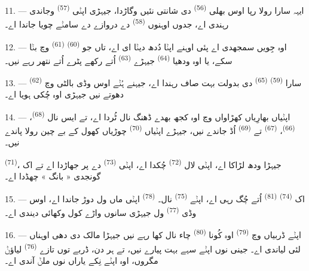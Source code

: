 11. --- ایہہ سارا رولا رپا اوس بھلی  \textsuperscript{(56)} دی
شانتی نئیں وگاڑدا، جیہڑی اپݨی  \textsuperscript{(57)} وجاندی رہندی اے،
جدوں اوہنوں  \textsuperscript{(58)} دے دروازے دے سامݨے چویا جاندا اے۔

12. --- اوہ جِویں سمجھدی اے پئی اوہنے اپݨا دُدھ دیݨا ای اے، تاں جو
 \textsuperscript{(60)}  \textsuperscript{(61)}
وچ  بݨا سکے، یا اوہ ودھیا  \textsuperscript{(64)} جیہڑے
 \textsuperscript{(63)} اُتے رکھے پٹرے اُتے نتھر رہے نیں۔

13. --- سارا  \textsuperscript{(59)} 
\textsuperscript{(65)} دی بدولت بہت صاف رہندا اے، جیہنے ہُݨے اوس وڈی بالٹی وچ
 \textsuperscript{(62)} دھوتے نیں جیہڑی اوہ چُکی ہویا اے۔

\VUsaut{3.0mm}
\VUsaut{3.0mm}

14. --- اپݨیاں بھارِیاں کھڑاواں وچ اوہ کجھ بھدے ڈھنگ نال ٹُردا اے، تے ایس نال
 \textsuperscript{(68)}،  \textsuperscript{(66)}،
 \textsuperscript{(67)} تے  \textsuperscript{(69)}
اُڈ جاندے نیں، جیہڑے اپݨیاں  \textsuperscript{(70)} چوڑیاں کھول کے بے
چین رولا پاندے نیں۔

 \textsuperscript{(71)}، جیہڑا ودھ لڑاکا اے، اپݨی لال 
\textsuperscript{(72)} چُکدا اے، اپݨی  \textsuperscript{(73)} دے پر جھاڑدا
اے تے اک گونجدی « بانگ » چھڈدا اے۔

15. --- اک  \textsuperscript{(74)} 
\textsuperscript{(81)} اُتے چُگ رہی اے، اپݨے  \textsuperscript{(75)}
نال۔  \textsuperscript{(78)} اپݨی ماں ول دوڑ جاندا اے، اوس وڈی
 \textsuperscript{(77)} ول جیہڑی سانوں واڑے کول وکھائی دیندی اے۔

16. --- اپݨے ڈربیاں وچ  \textsuperscript{(79)} اوہ کُونا 
\textsuperscript{(80)} چاء نال کھا رہے نیں جیہڑا مالک دی دھی اوہناں لئی لیاندی اے۔
جینی نوں اپݨے سہے بہت پیارے نیں، تے ہر دن، ڈربے توں تازے 
\textsuperscript{(76)} لیاؤݨ مگروں، اوہ اپݨے نِکے یاراں نوں ملݨ آندی اے۔
\VUsaut{6.0mm}
\VUfilet{22mm}
